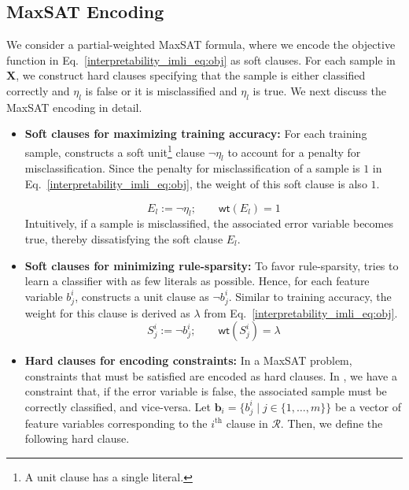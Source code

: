 \subsection{MaxSAT Encoding}
\label{interpretability_imli_sec:encoding}
We consider a partial-weighted MaxSAT formula, where we encode the objective function in Eq.~\eqref{interpretability_imli_eq:obj} as soft clauses. For each sample in $ \mathbf{X} $, we construct hard clauses specifying that the sample is either  classified correctly and $ \eta_l $ is false or it is misclassified and $ \eta_l $ is true. We next discuss the MaxSAT encoding in detail.

\begin{itemize}
	\item \textbf{Soft clauses for maximizing training accuracy:} For each training sample, {\imli} constructs a soft unit\footnote{A unit clause has a single literal.} clause $ \neg \eta_l $ to account for a penalty for misclassification. Since the penalty for misclassification of a sample is $ 1 $  in Eq.~\eqref{interpretability_imli_eq:obj},  the weight of this soft clause is also $ 1 $. 
	
	\begin{equation}
		\label{interpretability_imli_soft_clause_error}
		E_l:=\neg \eta_l;  \qquad \mathsf{wt}(E_l)= 1
	\end{equation}
	Intuitively, if a sample is misclassified, the associated error variable becomes true, thereby dissatisfying the soft clause $ E_l $.
	 
	
	\item \textbf{Soft clauses for minimizing rule-sparsity:} To favor rule-sparsity, {\imli} tries to learn a classifier with as few literals as possible. Hence, for each feature variable $ b_j^i $, {\imli} constructs a unit clause as $ \neg b_j^i $. Similar to training accuracy, the weight for this clause is derived as $ \lambda $ from Eq.~\eqref{interpretability_imli_eq:obj}.
	\begin{equation}
		\label{interpretability_imli_soft_clause_feature}
		S_j^i:= \neg b_j^i; \qquad \mathsf{wt}(S_j^i)= \lambda
	\end{equation}
	

	
	\item \textbf{Hard clauses for encoding constraints:} In a MaxSAT problem, constraints that must be satisfied are encoded as hard clauses. In {\imli}, we have a constraint that, if the error variable is false, the associated sample must be correctly classified, and vice-versa. Let  $\mathbf{b}_i= \{b^i_{j} \mid j \in \{1,\dots,m \}\}$ be a vector of feature variables corresponding to the $ i^\text{th} $  clause in $ \mathcal{R} $. Then, we define the following hard clause.
	

\end{itemize}
